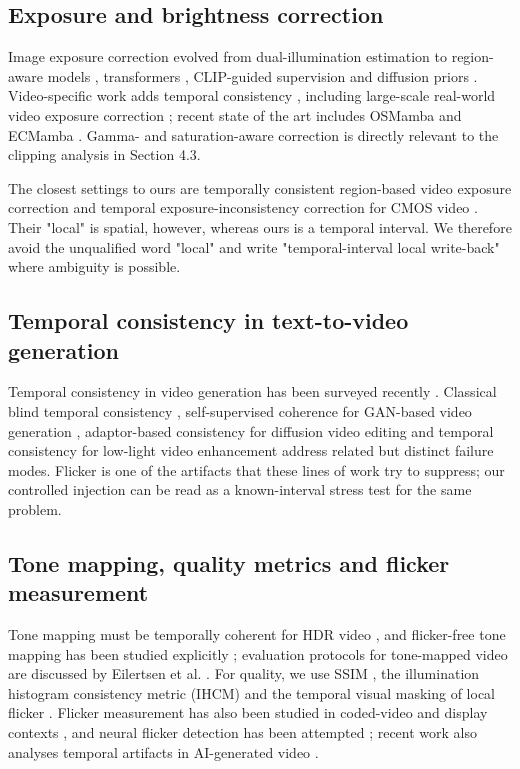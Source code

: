 \documentclass[twocolumn,10pt]{svjour3}
\begin{document}
\subsection{Exposure and brightness correction}

Image exposure correction evolved from dual-illumination estimation \cite{zhang2019dual} to region-aware models \cite{liu2024region}, transformers \cite{li2023fearless}, CLIP-guided supervision \cite{huang2025clip} and diffusion priors \cite{li2026high}. Video-specific work adds temporal consistency \cite{dong2015temporally,vo2012temporal,petrova2009unsupervised}, including large-scale real-world video exposure correction \cite{zhang2026learning}; recent state of the art includes OSMamba \cite{li2025osmamba} and ECMamba \cite{dong2024ecmamba}. Gamma- and saturation-aware correction \cite{kim2025agcsnet} is directly relevant to the clipping analysis in Section 4.3.


The closest settings to ours are temporally consistent region-based video exposure correction \cite{dong2015temporally} and temporal exposure-inconsistency correction for CMOS video \cite{vo2012temporal}. Their "local" is spatial, however, whereas ours is a temporal interval. We therefore avoid the unqualified word "local" and write "temporal-interval local write-back" where ambiguity is possible.


\subsection{Temporal consistency in text-to-video generation}

Temporal consistency in video generation has been surveyed recently . Classical blind temporal consistency , self-supervised coherence for GAN-based video generation , adaptor-based consistency for diffusion video editing \cite{song2025efficient} and temporal consistency for low-light video enhancement \cite{zhang2021learning} address related but distinct failure modes. Flicker is one of the artifacts that these lines of work try to suppress; our controlled injection can be read as a known-interval stress test for the same problem.


\subsection{Tone mapping, quality metrics and flicker measurement}

Tone mapping must be temporally coherent for HDR video \cite{aydin2014temporally,oskarsson2016temporally}, and flicker-free tone mapping has been studied explicitly \cite{mujtaba2022efficient}; evaluation protocols for tone-mapped video are discussed by Eilertsen et al. . For quality, we use SSIM , the illumination histogram consistency metric (IHCM) \cite{chen2024illumination} and the temporal visual masking of local flicker . Flicker measurement has also been studied in coded-video and display contexts \cite{yang2008effective}, and neural flicker detection has been attempted \cite{patel2018effective}; recent work also analyses temporal artifacts in AI-generated video \cite{d2026temporal}.
\end{document}
